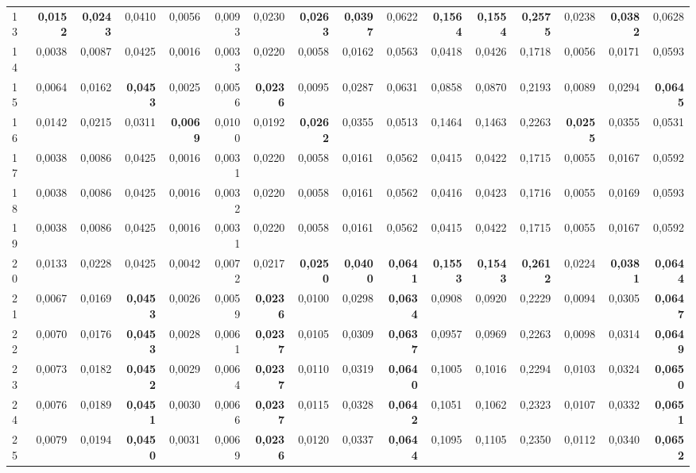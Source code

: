 \begin{table}[htp!]
\begin{adjustwidth}{-2cm}{}
\begin{tabular}{ l | *{15}{| r}}
13	&	\textbf{0,0152}	&	\textbf{0,0243}	&	0,0410	&	0,0056	&	0,0093	&	0,0230	&	\textbf{0,0263}	&	\textbf{0,0397}	&	0,0622	&	\textbf{0,1564}	&	\textbf{0,1554}	&	\textbf{0,2575}	&	0,0238	&	\textbf{0,0382}	&	0,0628	\\
14	&	0,0038	&	0,0087	&	0,0425	&	0,0016	&	0,0033	&	0,0220	&	0,0058	&	0,0162	&	0,0563	&	0,0418	&	0,0426	&	0,1718	&	0,0056	&	0,0171	&	0,0593	\\
15	&	0,0064	&	0,0162	&	\textbf{0,0453}	&	0,0025	&	0,0056	&	\textbf{0,0236}	&	0,0095	&	0,0287	&	0,0631	&	0,0858	&	0,0870	&	0,2193	&	0,0089	&	0,0294	&	\textbf{0,0645}	\\
16	&	0,0142	&	0,0215	&	0,0311	&	\textbf{0,0069}	&	0,0100	&	0,0192	&	\textbf{0,0262}	&	0,0355	&	0,0513	&	0,1464	&	0,1463	&	0,2263	&	\textbf{0,0255}	&	0,0355	&	0,0531	\\
17	&	0,0038	&	0,0086	&	0,0425	&	0,0016	&	0,0031	&	0,0220	&	0,0058	&	0,0161	&	0,0562	&	0,0415	&	0,0422	&	0,1715	&	0,0055	&	0,0167	&	0,0592	\\
18	&	0,0038	&	0,0086	&	0,0425	&	0,0016	&	0,0032	&	0,0220	&	0,0058	&	0,0161	&	0,0562	&	0,0416	&	0,0423	&	0,1716	&	0,0055	&	0,0169	&	0,0593	\\
19	&	0,0038	&	0,0086	&	0,0425	&	0,0016	&	0,0031	&	0,0220	&	0,0058	&	0,0161	&	0,0562	&	0,0415	&	0,0422	&	0,1715	&	0,0055	&	0,0167	&	0,0592	\\
20	&	0,0133	&	0,0228	&	0,0425	&	0,0042	&	0,0072	&	0,0217	&	\textbf{0,0250}	&	\textbf{0,0400}	&	\textbf{0,0641}	&	\textbf{0,1553}	&	\textbf{0,1543}	&	\textbf{0,2612}	&	0,0224	&	\textbf{0,0381}	&	\textbf{0,0644}	\\
21	&	0,0067	&	0,0169	&	\textbf{0,0453}	&	0,0026	&	0,0059	&	\textbf{0,0236}	&	0,0100	&	0,0298	&	\textbf{0,0634}	&	0,0908	&	0,0920	&	0,2229	&	0,0094	&	0,0305	&	\textbf{0,0647}	\\
22	&	0,0070	&	0,0176	&	\textbf{0,0453}	&	0,0028	&	0,0061	&	\textbf{0,0237}	&	0,0105	&	0,0309	&	\textbf{0,0637}	&	0,0957	&	0,0969	&	0,2263	&	0,0098	&	0,0314	&	\textbf{0,0649}	\\
23	&	0,0073	&	0,0182	&	\textbf{0,0452}	&	0,0029	&	0,0064	&	\textbf{0,0237}	&	0,0110	&	0,0319	&	\textbf{0,0640}	&	0,1005	&	0,1016	&	0,2294	&	0,0103	&	0,0324	&	\textbf{0,0650}	\\
24	&	0,0076	&	0,0189	&	\textbf{0,0451}	&	0,0030	&	0,0066	&	\textbf{0,0237}	&	0,0115	&	0,0328	&	\textbf{0,0642}	&	0,1051	&	0,1062	&	0,2323	&	0,0107	&	0,0332	&	\textbf{0,0651}	\\
25	&	0,0079	&	0,0194	&	\textbf{0,0450}	&	0,0031	&	0,0069	&	\textbf{0,0236}	&	0,0120	&	0,0337	&	\textbf{0,0644}	&	0,1095	&	0,1105	&	0,2350	&	0,0112	&	0,0340	&	\textbf{0,0652}	\\

\end{tabular}
\end{adjustwidth}
\end{table}
